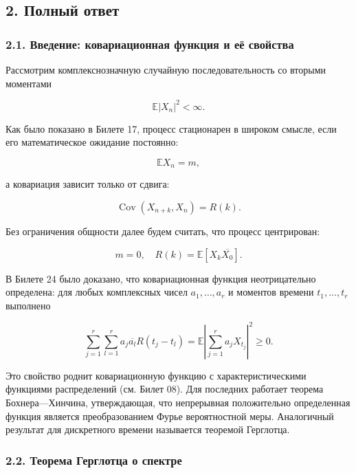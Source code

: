 \documentclass[
  11pt,
  a4paper,
]{article}
\begin{document}
\subsection{2. Полный
ответ}\label{ux43fux43eux43bux43dux44bux439-ux43eux442ux432ux435ux442}

\subsubsection{2.1. Введение: ковариационная функция и её
свойства}\label{ux432ux432ux435ux434ux435ux43dux438ux435-ux43aux43eux432ux430ux440ux438ux430ux446ux438ux43eux43dux43dux430ux44f-ux444ux443ux43dux43aux446ux438ux44f-ux438-ux435ux451-ux441ux432ux43eux439ux441ux442ux432ux430}

Рассмотрим комплекснозначную случайную последовательность со вторыми
моментами

\[
\mathbb E|X_n|^2 < \infty.
\]

Как было показано в Билете 17, процесс стационарен в широком смысле,
если его математическое ожидание постоянно:

\[
\mathbb E X_n = m,
\]

а ковариация зависит только от сдвига:

\[
\operatorname{Cov}(X_{n+k}, X_n) = R(k).
\]

Без ограничения общности далее будем считать, что процесс центрирован:

\[
m = 0, \quad R(k) = \mathbb E[X_k \overline{X_0}].
\]

В Билете 24 было доказано, что ковариационная функция неотрицательно
определена: для любых комплексных чисел \(a_1, \ldots, a_r\) и моментов
времени \(t_1, \ldots, t_r\) выполнено

\[
\sum_{j=1}^r \sum_{l=1}^r a_j \overline{a_l} R(t_j - t_l) = \mathbb E \left| \sum_{j=1}^r a_j X_{t_j} \right|^2 \ge 0.
\]

Это свойство роднит ковариационную функцию с характеристическими
функциями распределений (см. Билет 08). Для последних работает теорема
Бохнера---Хинчина, утверждающая, что непрерывная положительно
определенная функция является преобразованием Фурье вероятностной меры.
Аналогичный результат для дискретного времени называется теоремой
Герглотца.

\subsubsection{2.2. Теорема Герглотца о
спектре}\label{ux442ux435ux43eux440ux435ux43cux430-ux433ux435ux440ux433ux43bux43eux442ux446ux430-ux43e-ux441ux43fux435ux43aux442ux440ux435}
\end{document}
